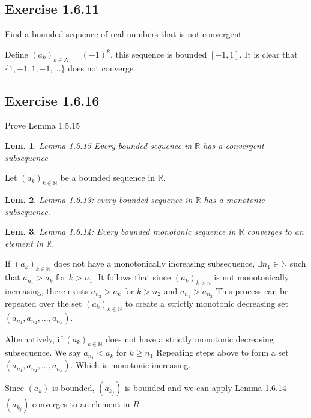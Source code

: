 \documentclass{tufte-book}
\theoremstyle{mytheoremstyle}
\theoremstyle{mylemstyle}
\newtheorem*{lem}{Lem.}
\theoremstyle{mydefstyle}
\begin{document}
\subsection{Exercise 1.6.11}
Find a bounded sequence of real numbers that is not convergent.

Define $(a_k)_{k \in \mathcal{N}} = (-1)^k$, this sequence is bounded $[-1,1]$.  It is clear that $\{1,-1,1,-1,...\}$ does not converge.

\subsection{Exercise 1.6.16}
Prove Lemma 1.5.15
\begin{lem}Lemma 1.5.15 Every bounded sequence in $\mathbb{R}$ has a convergent subsequence\end{lem} 

Let $(a_k)_{k \in \mathbb{N}}$ be a bounded sequence in $\mathbb{R}$.

\begin{lem}Lemma 1.6.13: every bounded sequence in $\mathbb{R}$ has a monotonic subsequence.
\end{lem}

\begin{lem}Lemma 1.6.14: Every bounded monotonic sequence in $\mathbb{R}$ converges to an element in $\mathbb{R}$. 
\end{lem}

If $(a_k)_{k \in \mathbb{N}}$ does not have a monotonically increasing subsequence, $\exists n_1 \in \mathbb{N}$ such that $a_{n_{1}} > a_k$ for $k > n_1$. It follows that since $(a_k)_{k>n}$ is not monotonically increasing, there exists $a_{n_{2}} > a_k$ for $k > n_2$ and $a_{n_{1}} > a_{n_{2}}$ 
This process can be repeated over the set $(a_k)_{k \in \mathbb{N}}$ to create a strictly monotonic decreasing set $(a_{n_{1}}, a_{n_{2}}, ..., a_{n_{k}})$.

Alternatively, if $(a_k)_{k \in \mathbb{N}}$ does not have a strictly monotonic decreasing subsequence.  We say $a_{n_{1}} < a_k$  for $k \geq n_1$ Repeating steps above to form a set $(a_{n_{1}}, a_{n_{2}}, ..., a_{n_{k}})$. Which is monotonic increasing.

Since  $(a_k)$ is bounded, $(a_{k_{j}})$ is bounded and we can apply Lemma 1.6.14 $(a_{k_{j}})$ converges to an element in ${R}$.
\end{document}

